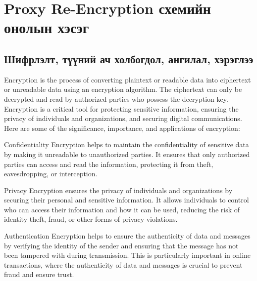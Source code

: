 
\chapter{Proxy Re-Encryption схемийн онолын хэсэг} %
\label{Chapter1} %
\pagecolor{white}

\newcommand{\keyword}[1]{\textbf{#1}}
\newcommand{\tabhead}[1]{\textbf{#1}}
\newcommand{\code}[1]{\texttt{#1}}
\newcommand{\file}[1]{\texttt{\bfseries#1}}
\newcommand{\option}[1]{\texttt{\itshape#1}}

\section{Шифрлэлт, түүний ач холбогдол, ангилал, хэрэглээ}

Encryption is the process of converting plaintext or readable data into ciphertext or unreadable data using an encryption algorithm. The ciphertext can only be decrypted and read by authorized parties who possess the decryption key. Encryption is a critical tool for protecting sensitive information, ensuring the privacy of individuals and organizations, and securing digital communications. Here are some of the significance, importance, and applications of encryption:

Confidentiality
Encryption helps to maintain the confidentiality of sensitive data by making it unreadable to unauthorized parties. It ensures that only authorized parties can access and read the information, protecting it from theft, eavesdropping, or interception.

Privacy
Encryption ensures the privacy of individuals and organizations by securing their personal and sensitive information. It allows individuals to control who can access their information and how it can be used, reducing the risk of identity theft, fraud, or other forms of privacy violations.

Authentication
Encryption helps to ensure the authenticity of data and messages by verifying the identity of the sender and ensuring that the message has not been tampered with during transmission. This is particularly important in online transactions, where the authenticity of data and messages is crucial to prevent fraud and ensure trust.


